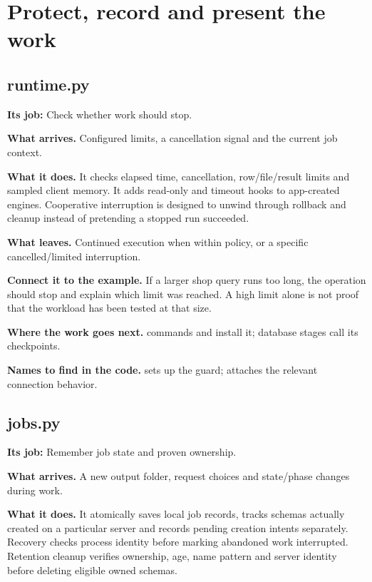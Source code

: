 \section{Protect, record and present the work}


\subsection{runtime.py}

\textbf{Its job:} Check whether work should stop.

\textbf{What arrives.} Configured limits, a cancellation signal and the current job context.

\textbf{What it does.} It checks elapsed time, cancellation, row/file/result limits and sampled client memory. It adds read-only and timeout hooks to app-created engines. Cooperative interruption is designed to unwind through rollback and cleanup instead of pretending a stopped run succeeded.

\textbf{What leaves.} Continued execution when within policy, or a specific cancelled/limited interruption.

\textbf{Connect it to the example.} If a larger shop query runs too long, the operation should stop and explain which limit was reached. A high limit alone is not proof that the workload has been tested at that size.

\textbf{Where the work goes next.} commands and  install it; database stages call its checkpoints.

\textbf{Names to find in the code.}  sets up the guard;  attaches the relevant connection behavior.


\subsection{jobs.py}

\textbf{Its job:} Remember job state and proven ownership.

\textbf{What arrives.} A new output folder, request choices and state/phase changes during work.

\textbf{What it does.} It atomically saves local job records, tracks schemas actually created on a particular server and records pending creation intents separately. Recovery checks process identity before marking abandoned work interrupted. Retention cleanup verifies ownership, age, name pattern and server identity before deleting eligible owned schemas.

